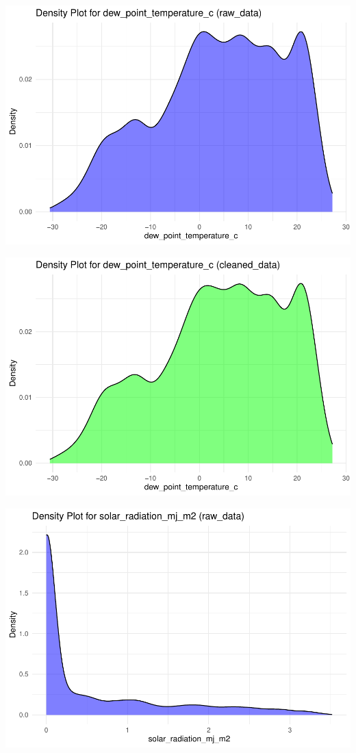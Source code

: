 \documentclass[
  11pt,
  letterpaper,
]{article}
\begin{document}
\begin{center}\includegraphics[width=1.2\linewidth,]{Final_Project_files/figure-latex/unnamed-chunk-15-11} \end{center}

\begin{center}\includegraphics[width=1.2\linewidth,]{Final_Project_files/figure-latex/unnamed-chunk-15-12} \end{center}

\begin{center}\includegraphics[width=1.2\linewidth,]{Final_Project_files/figure-latex/unnamed-chunk-15-13} \end{center}
\end{document}
